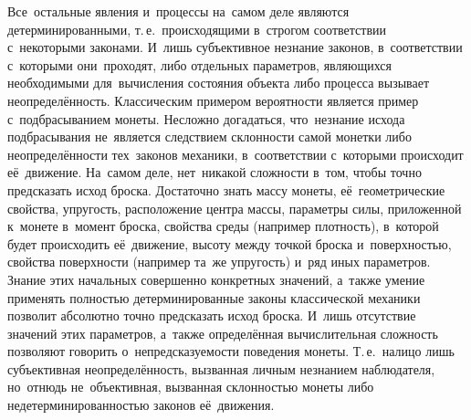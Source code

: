 \documentclass[]{scrartcl}
\begin{document}
Все~остальные явления и~процессы на~самом деле являются детерминированными, т.\,е.~происходящими в~строгом соответствии с~некоторыми законами. И~лишь субъективное незнание законов, в~соответствии с~которыми они~проходят, либо отдельных параметров, являющихся необходимыми для~вычисления состояния объекта либо процесса вызывает неопределённость. Классическим примером вероятности является пример с~подбрасыванием монеты. Несложно догадаться, что~незнание исхода подбрасывания не~является следствием склонности самой монетки либо неопределённости тех~законов механики, в~соответствии с~которыми происходит её~движение. На~самом деле, нет~никакой сложности в~том, чтобы точно предсказать исход броска. Достаточно знать массу монеты, её~геометрические свойства, упругость, расположение центра массы, параметры силы, приложенной к~монете в~момент броска, свойства среды (например плотность), в~которой будет происходить её~движение, высоту между точкой броска и~поверхностью, свойства поверхности (например та~же упругость) и~ряд иных параметров. Знание этих начальных совершенно конкретных значений, а~также умение применять полностью детерминированные законы классической механики позволит абсолютно точно предсказать исход броска. И~лишь отсутствие значений этих параметров, а~также определённая вычислительная сложность позволяют говорить о~непредсказуемости поведения монеты. Т.\,е.~налицо лишь субъективная неопределённость, вызванная личным незнанием наблюдателя, но~отнюдь не~объективная, вызванная склонностью монеты либо недетерминированностью законов её~движения.
\end{document}
